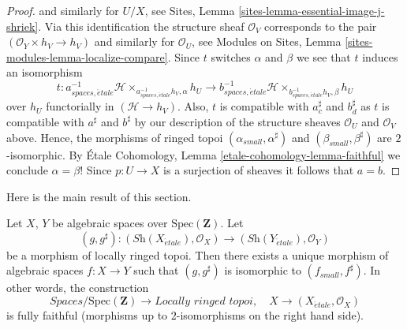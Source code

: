 \begin{proof}
and similarly for $U/X$, see
Sites, Lemma \ref{sites-lemma-essential-image-j-shriek}.
Via this identification the structure sheaf $\mathcal{O}_V$ corresponds to the
pair $(\mathcal{O}_Y \times h_V \to h_V)$ and similarly
for $\mathcal{O}_U$, see
Modules on Sites,
Lemma \ref{sites-modules-lemma-localize-compare}.
Since $t$ switches $\alpha$ and $\beta$ we see that $t$ induces an isomorphism
$$
t :
a_{spaces, \acute{e}tale}^{-1}\mathcal{H}
\times_{a_{spaces, \acute{e}tale}^{-1}h_V, \alpha}
h_U
\longrightarrow
b_{spaces, \acute{e}tale}^{-1}\mathcal{H}
\times_{b_{spaces, \acute{e}tale}^{-1}h_V, \beta}
h_U
$$
over $h_U$ functorially in $(\mathcal{H} \to h_V)$. Also, $t$ is compatible
with $a_c^\sharp$ and $b_d^\sharp$ as $t$ is
compatible with $a^\sharp$ and $b^\sharp$ by our description
of the structure sheaves $\mathcal{O}_U$ and $\mathcal{O}_V$
above. Hence, the morphisms of ringed topoi
$(\alpha_{small}, \alpha^\sharp)$ and $(\beta_{small}, \beta^\sharp)$
are $2$-isomorphic. By
\'Etale Cohomology, Lemma \ref{etale-cohomology-lemma-faithful}
we conclude $\alpha = \beta$! Since $p : U \to X$ is a surjection
of sheaves it follows that $a = b$.
\end{proof}

\noindent
Here is the main result of this section.

\begin{theorem}
\label{theorem-fully-faithful}
Let $X$, $Y$ be algebraic spaces over $\text{Spec}(\mathbf{Z})$.
Let
$$
(g, g^\sharp) :
(\textit{Sh}(X_{\acute{e}tale}), \mathcal{O}_X)
\longrightarrow
(\textit{Sh}(Y_{\acute{e}tale}), \mathcal{O}_Y)
$$
be a morphism of locally ringed topoi. Then there exists a
unique morphism of algebraic spaces $f : X \to Y$ such that
$(g, g^\sharp)$ is isomorphic to $(f_{small}, f^\sharp)$.
In other words, the construction
$$
\textit{Spaces}/\text{Spec}(\mathbf{Z})
\longrightarrow \textit{Locally ringed topoi},
\quad
X \longrightarrow (X_{\acute{e}tale}, \mathcal{O}_X)
$$
is fully faithful (morphisms up to $2$-isomorphisms on the right hand side).
\end{theorem}

